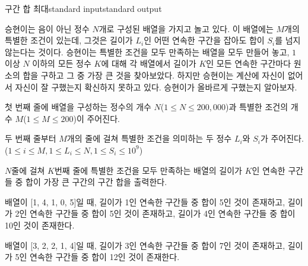 \begin{problem}{구간 합 최대}{standard input}{standard output}

승현이는 음이 아닌 정수 $N$개로 구성된 배열을 가지고 놀고 있다. 이 배열에는 $M$개의 특별한 조건이 있는데, 그것은 길이가 $L_i$인 어떤 연속한 구간을 잡아도 합이 $S_i$를 넘지 않는다는 것이다. 승현이는 특별한 조건을 모두 만족하는 배열을 모두 만들어 놓고, $1$ 이상 $N$ 이하의 모든 정수 $K$에 대해 각 배열에서 길이가 $K$인 모든 연속한 구간마다 원소의 합을 구하고 그 중 가장 큰 것을 찾아보았다. 하지만 승현이는 계산에 자신이 없어서 자신이 잘 구했는지 확신하지 못하고 있다. 승현이가 올바르게 구했는지 알아보자.

\InputFile
첫 번째 줄에 배열을 구성하는 정수의 개수 $N$($1 \le N \le 200,000$)과 특별한 조건의 개수 $M$($1 \le M \le 200$)이 주어진다.

두 번째 줄부터 $M$개의 줄에 걸쳐 특별한 조건을 의미하는 두 정수 $L_i$와 $S_i$가 주어진다. ($1 \le i \le M, 1 \le L_i \le N, 1 \le S_i \le 10^9$)

\OutputFile
$N$줄에 걸쳐 $K$번째 줄에 특별한 조건을 모두 만족하는 배열의 길이가 $K$인 연속한 구간들 중 합이 가장 큰 구간의 구간 합을 출력한다.

\Example

\begin{example}
%
\end{example}

\Notes

배열이 [1, 4, 1, 0, 5]일 때, 길이가 1인 연속한 구간들 중 합이 5인 것이 존재하고, 길이가 2인 연속한 구간들 중 합이 5인 것이 존재하고, 길이가 4인 연속한 구간들 중 합이 10인 것이 존재한다.

배열이 [3, 2, 2, 1, 4]일 때, 길이가 3인 연속한 구간들 중 합이 7인 것이 존재하고, 길이가 5인 연속한 구간들 중 합이 12인 것이 존재한다.

\end{problem}
